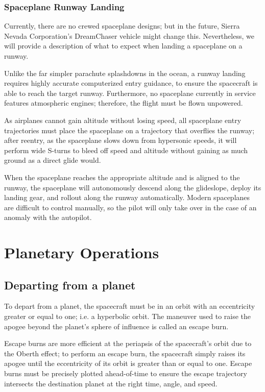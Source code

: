 \documentclass[oneside,a5paper]{book}
\begin{document}
\subsection{Spaceplane Runway Landing}

Currently, there are no crewed spaceplane designs; but in the future,
Sierra Nevada Corporation’s DreamChaser vehicle might change
this. Nevertheless, we will provide a description of what to expect
when landing a spaceplane on a runway.

Unlike the far simpler parachute splashdowns in the ocean, a runway
landing requires highly accurate computerized entry guidance, to
ensure the spacecraft is able to reach the target runway. Furthermore,
no spaceplane currently in service features atmospheric engines;
therefore, the flight must be flown unpowered.

As airplanes cannot gain altitude without losing speed, all spaceplane
entry trajectories must place the spaceplane on a trajectory that
overflies the runway; after reentry, as the spaceplane slows down from
hypersonic speeds, it will perform wide S-turns to bleed off speed and
altitude without gaining as much ground as a direct glide would.

When the spaceplane reaches the appropriate altitude and is aligned to
the runway, the spaceplane will autonomously descend along the
glideslope, deploy its landing gear, and rollout along the runway
automatically. Modern spaceplanes are difficult to control manually,
so the pilot will only take over in the case of an anomaly with the
autopilot.

\chapter{Planetary Operations}

\section{Departing from a planet}

To depart from a planet, the spacecraft must be in an orbit with an
eccentricity greater or equal to one; i.e. a hyperbolic orbit. The
maneuver used to raise the apogee beyond the planet’s sphere of
influence is called an escape burn.

Escape burns are more efficient at the periapsis of the spacecraft’s
orbit due to the Oberth effect; to perform an escape burn, the
spacecraft simply raises its apogee until the eccentricity of its
orbit is greater than or equal to one. Escape burns must be precisely
plotted ahead-of-time to ensure the escape trajectory intersects the
destination planet at the right time, angle, and speed.
\end{document}
